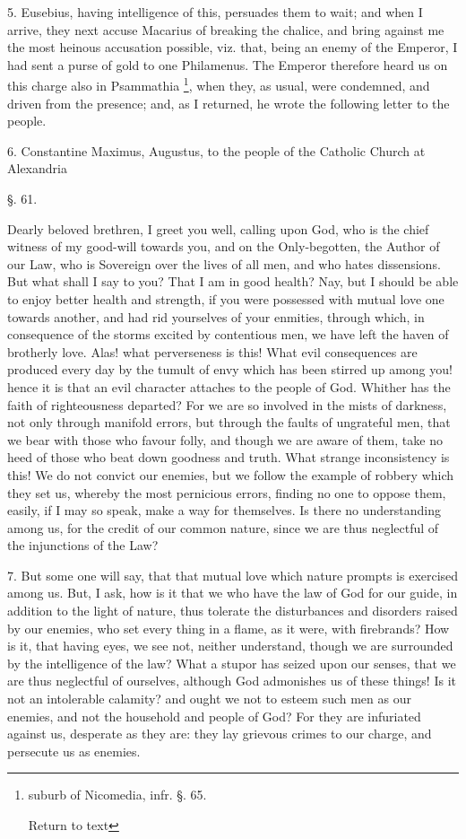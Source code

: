5. Eusebius, having intelligence of this,
persuades them to wait; and when I arrive, they next accuse Macarius
of breaking the chalice, and bring against me the most heinous
accusation possible, viz. that, being an enemy of the Emperor, I had
sent a purse of gold to one Philamenus. The Emperor therefore heard us
on this charge also in Psammathia \footnote{suburb of Nicomedia, infr. §. 65.

Return to text}, when they, as usual, were condemned, and driven from the
presence; and, as I returned, he wrote the following letter to the
people.

6. Constantine Maximus, Augustus, to the people
of the Catholic Church at Alexandria

§. 61.

Dearly beloved brethren, I greet you well,
calling upon God, who is the chief witness of my good-will towards
you, and on the Only-begotten, the Author of our Law, who is Sovereign
over the lives of all men, and who hates dissensions. But what shall I
say to you? That I am in good health? Nay, but I should be able to
enjoy better health and strength, if you were possessed with mutual
love one towards another, and had rid yourselves of your enmities,
through which, in consequence of the storms excited by contentious
men, we have left the haven of brotherly love. Alas! what perverseness
is this! What evil consequences are produced every day by the tumult
of envy which has been stirred up among you! hence it is that an evil
character attaches to the people of God. Whither has the faith of
righteousness departed? For we are so involved in the mists of
darkness, not only through manifold errors, but through the faults of
ungrateful men, that we bear with those who favour folly, and though
we are aware of them, take no heed of those who beat down goodness and
truth. What strange inconsistency is this! We do not convict our
enemies, but we follow the example of robbery which they set us,
whereby the most pernicious errors, finding no one to oppose them,
easily, if I may so speak, make a way for themselves. Is there no
understanding among us, for the credit of our common nature,
since we are thus neglectful of the injunctions of the Law?

7. But some one will say, that that mutual love
which nature prompts is exercised among us. But, I ask, how is it that
we who have the law of God for our guide, in addition to the light of
nature, thus tolerate the disturbances and disorders raised by our
enemies, who set every thing in a flame, as it were, with firebrands?
How is it, that having eyes, we see not, neither understand, though we
are surrounded by the intelligence of the law? What a stupor has
seized upon our senses, that we are thus neglectful of ourselves,
although God admonishes us of these things! Is it not an intolerable
calamity? and ought we not to esteem such men as our enemies, and not
the household and people of God? For they are infuriated against us,
desperate as they are: they lay grievous crimes to our charge, and
persecute us as enemies.

